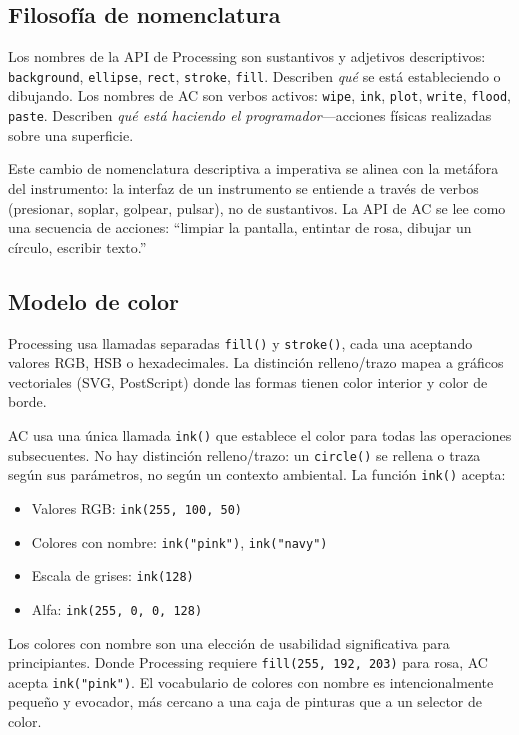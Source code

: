 \documentclass[10pt,letterpaper,twocolumn]{article}
\begin{document}
\subsection{Filosofía de nomenclatura}

Los nombres de la API de Processing son sustantivos y adjetivos descriptivos: \texttt{background}, \texttt{ellipse}, \texttt{rect}, \texttt{stroke}, \texttt{fill}. Describen \emph{qué} se está estableciendo o dibujando. Los nombres de AC son verbos activos: \texttt{wipe}, \texttt{ink}, \texttt{plot}, \texttt{write}, \texttt{flood}, \texttt{paste}. Describen \emph{qué está haciendo el programador}---acciones físicas realizadas sobre una superficie.

Este cambio de nomenclatura descriptiva a imperativa se alinea con la metáfora del instrumento: la interfaz de un instrumento se entiende a través de verbos (presionar, soplar, golpear, pulsar), no de sustantivos. La API de AC se lee como una secuencia de acciones: ``limpiar la pantalla, entintar de rosa, dibujar un círculo, escribir texto.''

\subsection{Modelo de color}

Processing usa llamadas separadas \texttt{fill()} y \texttt{stroke()}, cada una aceptando valores RGB, HSB o hexadecimales. La distinción relleno/trazo mapea a gráficos vectoriales (SVG, PostScript) donde las formas tienen color interior y color de borde.

AC usa una única llamada \texttt{ink()} que establece el color para todas las operaciones subsecuentes. No hay distinción relleno/trazo: un \texttt{circle()} se rellena o traza según sus parámetros, no según un contexto ambiental. La función \texttt{ink()} acepta:

\begin{itemize}
  \item Valores RGB: \texttt{ink(255, 100, 50)}
  \item Colores con nombre: \texttt{ink("pink")}, \texttt{ink("navy")}
  \item Escala de grises: \texttt{ink(128)}
  \item Alfa: \texttt{ink(255, 0, 0, 128)}
\end{itemize}

Los colores con nombre son una elección de usabilidad significativa para principiantes. Donde Processing requiere \texttt{fill(255, 192, 203)} para rosa, AC acepta \texttt{ink("pink")}. El vocabulario de colores con nombre es intencionalmente pequeño y evocador, más cercano a una caja de pinturas que a un selector de color.
\end{document}
